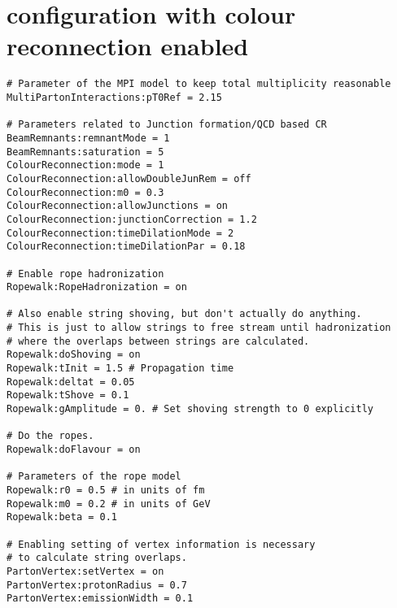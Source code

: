\section{\Pythiaeight configuration with colour reconnection enabled}
\begin{verbatim}
# Parameter of the MPI model to keep total multiplicity reasonable
MultiPartonInteractions:pT0Ref = 2.15

# Parameters related to Junction formation/QCD based CR
BeamRemnants:remnantMode = 1
BeamRemnants:saturation = 5
ColourReconnection:mode = 1
ColourReconnection:allowDoubleJunRem = off
ColourReconnection:m0 = 0.3
ColourReconnection:allowJunctions = on
ColourReconnection:junctionCorrection = 1.2
ColourReconnection:timeDilationMode = 2
ColourReconnection:timeDilationPar = 0.18

# Enable rope hadronization
Ropewalk:RopeHadronization = on

# Also enable string shoving, but don't actually do anything.
# This is just to allow strings to free stream until hadronization
# where the overlaps between strings are calculated.
Ropewalk:doShoving = on
Ropewalk:tInit = 1.5 # Propagation time
Ropewalk:deltat = 0.05
Ropewalk:tShove = 0.1
Ropewalk:gAmplitude = 0. # Set shoving strength to 0 explicitly

# Do the ropes.
Ropewalk:doFlavour = on

# Parameters of the rope model
Ropewalk:r0 = 0.5 # in units of fm
Ropewalk:m0 = 0.2 # in units of GeV
Ropewalk:beta = 0.1

# Enabling setting of vertex information is necessary
# to calculate string overlaps.
PartonVertex:setVertex = on
PartonVertex:protonRadius = 0.7
PartonVertex:emissionWidth = 0.1
\end{verbatim}


